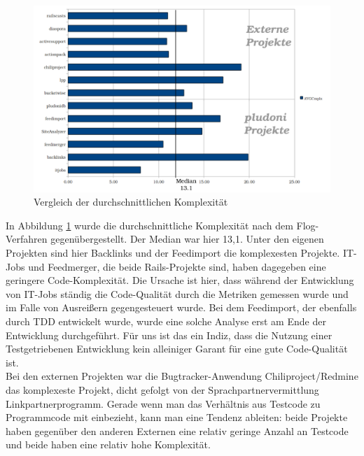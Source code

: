 \begin{figure}[htbp]
 \centering
 \includegraphics[width=\linewidth]{./diagrams/cmp-complex.pdf}
 \caption{Vergleich der durchschnittlichen Komplexität}
 \label{fig:cpm-complex}
\end{figure}
In Abbildung \ref{fig:cpm-complex} wurde die durchschnittliche Komplexität nach dem Flog-Verfahren gegenübergestellt. Der Median war hier 13,1. Unter den eigenen Projekten sind hier Backlinks und der Feedimport die komplexesten Projekte. IT-Jobs und Feedmerger, die beide Rails-Projekte sind, haben dagegeben eine geringere Code-Komplexität. Die Ursache ist hier, dass während der Entwicklung von IT-Jobs ständig die Code-Qualität durch die Metriken gemessen wurde und im Falle von Ausreißern gegengesteuert wurde. Bei dem Feedimport, der ebenfalls durch TDD entwickelt wurde, wurde eine solche Analyse erst am Ende der Entwicklung durchgeführt. Für uns ist das ein Indiz, dass die Nutzung einer Testgetriebenen Entwicklung kein alleiniger Garant für eine gute Code-Qualität ist.\\
Bei den externen Projekten war die Bugtracker-Anwendung Chiliproject/Redmine das komplexeste Projekt, dicht gefolgt von der Sprachpartnervermittlung Linkpartnerprogramm. Gerade wenn man das Verhältnis aus Testcode zu Programmcode mit einbezieht, kann man eine Tendenz ableiten: beide Projekte haben gegenüber den anderen Externen eine relativ geringe Anzahl an Testcode und beide haben eine relativ hohe Komplexität.

